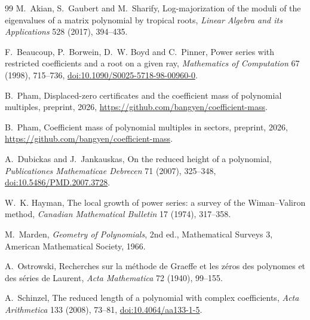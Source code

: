 \documentclass[11pt]{article}
\begin{document}
\begin{thebibliography}{99}
\small
{}
M.~Akian, S.~Gaubert and M.~Sharify,
\newblock Log-majorization of the moduli of the eigenvalues of a matrix
polynomial by tropical roots,
\newblock \emph{Linear Algebra and its Applications} 528 (2017), 394--435.

F.~Beaucoup, P.~Borwein, D.~W. Boyd and C.~Pinner,
\newblock Power series with restricted coefficients and a root on a given ray,
\newblock \emph{Mathematics of Computation} 67 (1998), 715--736,
\newblock \href{https://doi.org/10.1090/S0025-5718-98-00960-0}
{doi:10.1090/S0025-5718-98-00960-0}.

B.~Pham,
\newblock Displaced-zero certificates and the coefficient mass of polynomial
multiples,
\newblock preprint, 2026, \url{https://github.com/bangyen/coefficient-mass}.

B.~Pham,
\newblock Coefficient mass of polynomial multiples in sectors,
\newblock preprint, 2026, \url{https://github.com/bangyen/coefficient-mass}.

A.~Dubickas and J.~Jankauskas,
\newblock On the reduced height of a polynomial,
\newblock \emph{Publicationes Mathematicae Debrecen} 71 (2007), 325--348,
\newblock \href{https://doi.org/10.5486/PMD.2007.3728}
{doi:10.5486/PMD.2007.3728}.

W.~K. Hayman,
\newblock The local growth of power series: a survey of the Wiman--Valiron
method,
\newblock \emph{Canadian Mathematical Bulletin} 17 (1974), 317--358.

M.~Marden,
\newblock \emph{Geometry of Polynomials}, 2nd ed.,
\newblock Mathematical Surveys 3, American Mathematical Society, 1966.

A.~Ostrowski,
\newblock Recherches sur la m\'ethode de Graeffe et les z\'eros des
polynomes et des s\'eries de Laurent,
\newblock \emph{Acta Mathematica} 72 (1940), 99--155.

A.~Schinzel,
\newblock The reduced length of a polynomial with complex coefficients,
\newblock \emph{Acta Arithmetica} 133 (2008), 73--81,
\newblock \href{https://doi.org/10.4064/aa133-1-5}
{doi:10.4064/aa133-1-5}.
\end{thebibliography}
\end{document}

